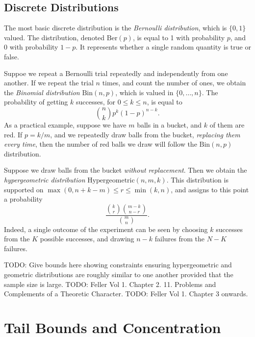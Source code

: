 \section{Discrete Distributions}

The most basic discrete distribution is the \emph{Bernoulli distribution}, which is $\{ 0, 1 \}$ valued. The distribution, denoted $\text{Ber}(p)$, is equal to 1 with probability $p$, and 0 with probability $1 - p$. It represents whether a single random quantity is true or false.

Suppoe we repeat a Bernoulli trial repeatedly and independently from one another. If we repeat the trial $n$ times, and count the number of ones, we obtain the \emph{Binomial distribution} $\text{Bin}(n,p)$, which is valued in $\{ 0, \dots, n \}$. The probability of getting $k$ successes, for $0 \leq k \leq n$, is equal to
%
\[ {n \choose k} p^k (1 - p)^{n-k}. \]
%
As a practical example, suppose we have $m$ balls in a bucket, and $k$ of them are red. If $p = k/m$, and we repeatedly draw balls from the bucket, \emph{replacing them every time}, then the number of red balls we draw will follow the $\text{Bin}(n,p)$ distribution.

Suppose we draw balls from the bucket \emph{without replacement}. Then we obtain the \emph{hypergeometric distribution} $\text{Hypergeometric}(n,m,k)$. This distribution is supported on $\max(0,n+k-m) \leq r \leq \min(k,n)$, and assigns to this point a probability
%
\[ \frac{{k \choose r} {m-k \choose n-r}}{{m \choose n}}. \]
%
Indeed, a single outcome of the experiment can be seen by choosing $k$ successes from the $K$ possible successes, and drawing $n-k$ failures from the $N-K$ failures.

TODO: Give bounds here showing constraints ensuring hypergeometric and geometric distributions are roughly similar to one another provided that the sample size is large.
TODO: Feller Vol 1. Chapter 2. 11. Problems and Complements of a Theoretic Character.
TODO: Feller Vol 1. Chapter 3 onwards.

\chapter{Tail Bounds and Concentration}

